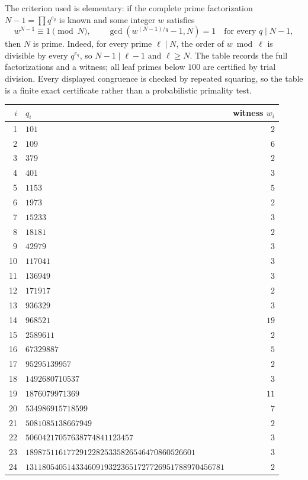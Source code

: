 \documentclass[11pt,a4paper]{article}
\theoremstyle{definition}\newtheorem{definition}[theorem]{Definition}
\theoremstyle{remark}\newtheorem{remark}[theorem]{Remark}
\begin{document}
The criterion used is elementary: if the complete prime factorization $N-1=\prod q^{e_q}$ is known and some integer $w$ satisfies
\[
 w^{N-1}\equiv1\pmod N,
 \qquad \gcd(w^{(N-1)/q}-1,N)=1\quad\text{for every }q\mid N-1,
\]
then $N$ is prime. Indeed, for every prime $\ell\mid N$, the order of $w\bmod\ell$ is divisible by every $q^{e_q}$, so $N-1\mid\ell-1$ and $\ell\ge N$. The table records the full factorizations and a witness; all leaf primes below $100$ are certified by trial division. Every displayed congruence is checked by repeated squaring, so the table is a finite exact certificate rather than a probabilistic primality test.

\begingroup\footnotesize
\begin{longtable}{r p{.58\linewidth} r}
\toprule $i$ & $q_i$ & witness $w_i$\\\midrule\endhead
1 & $101$ & $2$\\
2 & $109$ & $6$\\
3 & $379$ & $2$\\
4 & $401$ & $3$\\
5 & $1153$ & $5$\\
6 & $1973$ & $2$\\
7 & $15233$ & $3$\\
8 & $18181$ & $2$\\
9 & $42979$ & $3$\\
10 & $117041$ & $3$\\
11 & $136949$ & $3$\\
12 & $171917$ & $2$\\
13 & $936329$ & $3$\\
14 & $968521$ & $19$\\
15 & $2589611$ & $2$\\
16 & $67329887$ & $5$\\
17 & $95295139957$ & $2$\\
18 & $1492680710537$ & $3$\\
19 & $1876079971369$ & $11$\\
20 & $534986915718599$ & $7$\\
21 & $5081085138667949$ & $2$\\
22 & $50604217057638774841123457$ & $3$\\
23 & $18987511617729122825335826546470860526601$ & $3$\\
24 & $131180540514334609193223651727726951788970456781$ & $2$\\
\bottomrule\end{longtable}
\end{document}
